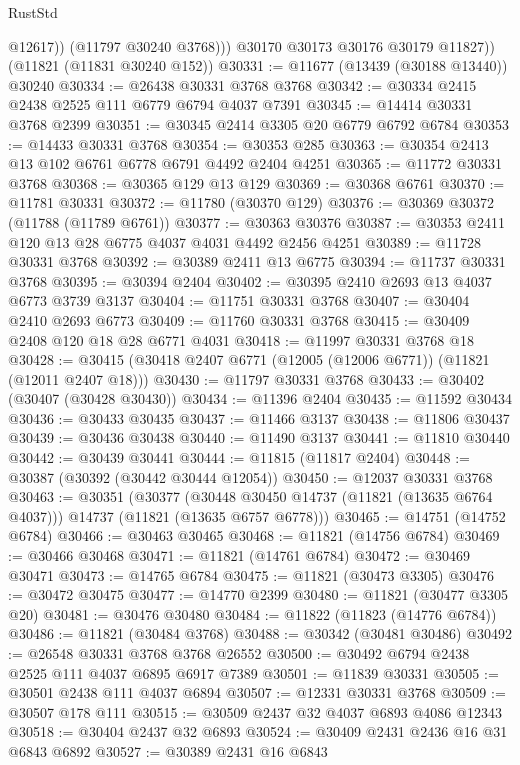 \begin{lexlean}{RustStd}
\begin{coremodule}
                @12617))
            (@11797 @30240 @3768)))
        @30170
        @30173
        @30176
        @30179
        @11827))
    (@11821 (@11831 @30240 @152))
@30331 := @11677 (@13439 (@30188 @13440)) @30240
@30334 := @26438 @30331 @3768 @3768
@30342 := @30334 @2415 @2438 @2525 @111 @6779 @6794 @4037 @7391
@30345 := @14414 @30331 @3768 @2399
@30351 := @30345 @2414 @3305 @20 @6779 @6792 @6784
@30353 := @14433 @30331 @3768
@30354 := @30353 @285
@30363 := @30354 @2413 @13 @102 @6761 @6778 @6791 @4492 @2404 @4251
@30365 := @11772 @30331 @3768
@30368 := @30365 @129 @13 @129
@30369 := @30368 @6761
@30370 := @11781 @30331
@30372 := @11780 (@30370 @129)
@30376 := @30369 @30372 (@11788 (@11789 @6761))
@30377 := @30363 @30376
@30387 := @30353 @2411 @120 @13 @28 @6775 @4037 @4031 @4492 @2456 @4251
@30389 := @11728 @30331 @3768
@30392 := @30389 @2411 @13 @6775
@30394 := @11737 @30331 @3768
@30395 := @30394 @2404
@30402 := @30395 @2410 @2693 @13 @4037 @6773 @3739 @3137
@30404 := @11751 @30331 @3768
@30407 := @30404 @2410 @2693 @6773
@30409 := @11760 @30331 @3768
@30415 := @30409 @2408 @120 @18 @28 @6771 @4031
@30418 := @11997 @30331 @3768 @18
@30428 := @30415 (@30418 @2407 @6771 (@12005 (@12006 @6771)) (@11821 (@12011 @2407 @18)))
@30430 := @11797 @30331 @3768
@30433 := @30402 (@30407 (@30428 @30430))
@30434 := @11396 @2404
@30435 := @11592 @30434
@30436 := @30433 @30435
@30437 := @11466 @3137
@30438 := @11806 @30437
@30439 := @30436 @30438
@30440 := @11490 @3137
@30441 := @11810 @30440
@30442 := @30439 @30441
@30444 := @11815 (@11817 @2404)
@30448 := @30387 (@30392 (@30442 @30444 @12054))
@30450 := @12037 @30331 @3768
@30463 := @30351
    (@30377
      (@30448 @30450 @14737 (@11821 (@13635 @6764 @4037)))
      @14737
      (@11821 (@13635 @6757 @6778)))
@30465 := @14751 (@14752 @6784)
@30466 := @30463 @30465
@30468 := @11821 (@14756 @6784)
@30469 := @30466 @30468
@30471 := @11821 (@14761 @6784)
@30472 := @30469 @30471
@30473 := @14765 @6784
@30475 := @11821 (@30473 @3305)
@30476 := @30472 @30475
@30477 := @14770 @2399
@30480 := @11821 (@30477 @3305 @20)
@30481 := @30476 @30480
@30484 := @11822 (@11823 (@14776 @6784))
@30486 := @11821 (@30484 @3768)
@30488 := @30342 (@30481 @30486)
@30492 := @26548 @30331 @3768 @3768 @26552
@30500 := @30492 @6794 @2438 @2525 @111 @4037 @6895 @6917 @7389
@30501 := @11839 @30331
@30505 := @30501 @2438 @111 @4037 @6894
@30507 := @12331 @30331 @3768
@30509 := @30507 @178 @111
@30515 := @30509 @2437 @32 @4037 @6893 @4086 @12343
@30518 := @30404 @2437 @32 @6893
@30524 := @30409 @2431 @2436 @16 @31 @6843 @6892
@30527 := @30389 @2431 @16 @6843

\end{coremodule}
\end{lexlean}
